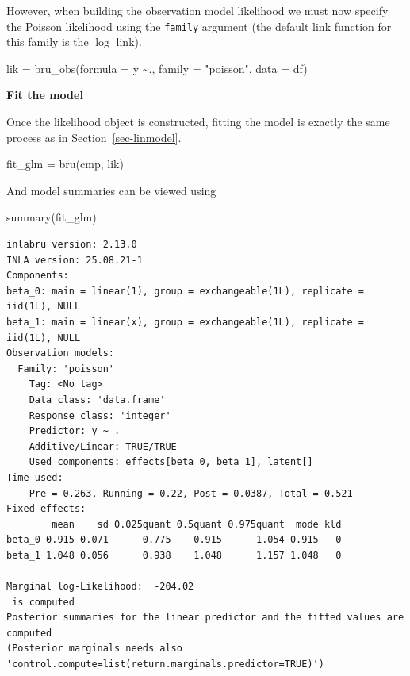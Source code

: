\documentclass[
  letterpaper,
  DIV=11,
  numbers=noendperiod]{scrartcl}
\newenvironment{Shaded}{\begin{snugshade}}{\end{snugshade}}
\newcommand{\AttributeTok}[1]{\textcolor[rgb]{0.40,0.45,0.13}{#1}}
\newcommand{\FunctionTok}[1]{\textcolor[rgb]{0.28,0.35,0.67}{#1}}
\newcommand{\NormalTok}[1]{\textcolor[rgb]{0.00,0.23,0.31}{#1}}
\newcommand{\OtherTok}[1]{\textcolor[rgb]{0.00,0.23,0.31}{#1}}
\newcommand{\SpecialCharTok}[1]{\textcolor[rgb]{0.37,0.37,0.37}{#1}}
\newcommand{\StringTok}[1]{\textcolor[rgb]{0.13,0.47,0.30}{#1}}
\begin{document}
However, when building the observation model likelihood we must now
specify the Poisson likelihood using the \texttt{family} argument (the
default link function for this family is the \(\log\) link).

\begin{Shaded}
\begin{Highlighting}[]
\NormalTok{lik }\OtherTok{=}  \FunctionTok{bru\_obs}\NormalTok{(}\AttributeTok{formula =}\NormalTok{ y }\SpecialCharTok{\textasciitilde{}}\NormalTok{.,}
            \AttributeTok{family =} \StringTok{"poisson"}\NormalTok{,}
            \AttributeTok{data =}\NormalTok{ df)}
\end{Highlighting}
\end{Shaded}

\textbf{Fit the model}

Once the likelihood object is constructed, fitting the model is exactly
the same process as in Section~\ref{sec-linmodel}.

\begin{Shaded}
\begin{Highlighting}[]
\NormalTok{fit\_glm }\OtherTok{=} \FunctionTok{bru}\NormalTok{(cmp, lik)}
\end{Highlighting}
\end{Shaded}

And model summaries can be viewed using

\begin{Shaded}
\begin{Highlighting}[]
\FunctionTok{summary}\NormalTok{(fit\_glm)}
\end{Highlighting}
\end{Shaded}

\begin{verbatim}
inlabru version: 2.13.0
INLA version: 25.08.21-1
Components:
beta_0: main = linear(1), group = exchangeable(1L), replicate = iid(1L), NULL
beta_1: main = linear(x), group = exchangeable(1L), replicate = iid(1L), NULL
Observation models:
  Family: 'poisson'
    Tag: <No tag>
    Data class: 'data.frame'
    Response class: 'integer'
    Predictor: y ~ .
    Additive/Linear: TRUE/TRUE
    Used components: effects[beta_0, beta_1], latent[]
Time used:
    Pre = 0.263, Running = 0.22, Post = 0.0387, Total = 0.521 
Fixed effects:
        mean    sd 0.025quant 0.5quant 0.975quant  mode kld
beta_0 0.915 0.071      0.775    0.915      1.054 0.915   0
beta_1 1.048 0.056      0.938    1.048      1.157 1.048   0

Marginal log-Likelihood:  -204.02 
 is computed 
Posterior summaries for the linear predictor and the fitted values are computed
(Posterior marginals needs also 'control.compute=list(return.marginals.predictor=TRUE)')
\end{verbatim}
\end{document}
